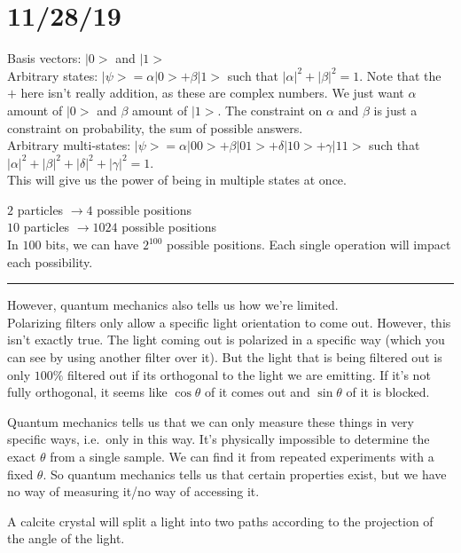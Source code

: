 \documentclass[12 pt]{article}
\begin{document}
\section{11/28/19}
Basis vectors: $|0>$ and $|1>$
\\ Arbitrary states: $| \psi > = \alpha | 0 > + \beta | 1 >$ such
that $| \alpha |^2 + |\beta|^2 = 1$. Note that the $+$ here isn't
really addition, as these are complex numbers. We just want $\alpha$
amount of $|0>$ and $\beta$ amount of $|1>$. The constraint on
$\alpha$ and $\beta$ is just a constraint on probability, the sum of
possible answers.
\\ Arbitrary multi-states: $|\psi > = \alpha |00> + \beta |01> +
\delta|10> + \gamma |11>$ such that $|\alpha|^2 + |\beta|^2 +
|\delta|^2 + |\gamma|^2 = 1$.
\\ This will give us the power of being in multiple states at once.

$2$ particles $\to 4$ possible positions
\\$10$ particles $\to 1024$ possible positions
\\ In $100$ bits, we can have $2^{100}$ possible positions. Each
single operation will impact each possibility.
\\ \noindent \rule{\textwidth}{0.5pt}
However, quantum mechanics also tells us how we're limited.
\\ Polarizing filters only allow a specific light orientation to come
out. However, this isn't exactly true. The light coming out is
polarized in a specific way (which you can see by using another filter
over it). But the light that is being filtered out is only $100\%$
filtered out if its orthogonal to the light we are emitting. If it's
not fully orthogonal, it seems like $\cos \theta$ of it comes out and
$\sin \theta$ of it is blocked.

Quantum mechanics tells us that we can only measure these things in
very specific ways, i.e.\ only in this way. It's physically impossible
to determine the exact $\theta$ from a single sample. We can find it
from repeated experiments with a fixed $\theta$. So quantum mechanics
tells us that certain properties exist, but we have no way of
measuring it/no way of accessing it.

A calcite crystal will split a light into two paths according to the
projection of the angle of the light.
\end{document}
